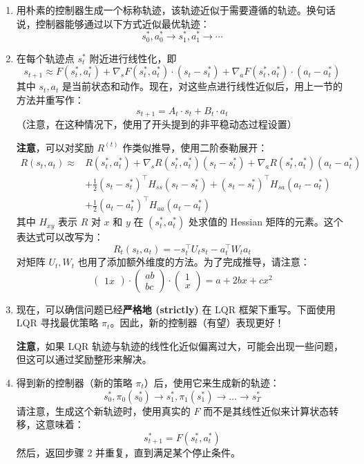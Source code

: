 \begin{enumerate}[label=\textbf{步骤 \arabic*}]
    \item 用朴素的控制器生成一个标称轨迹，该轨迹近似于需要遵循的轨迹。换句话说，控制器能够通过以下方式近似最优轨迹：
    \[
        s^*_0, a^*_0 \rightarrow s^*_1, a^*_1 \rightarrow \cdots
    \]

    \item 在每个轨迹点 $s^*_t$ 附近进行线性化，即
    \[
        s_{t+1} \approx F(s^*_t, a^*_t) + \nabla_s F(s^*_t, a^*_t) \cdot (s_t - s^*_t) + \nabla_a F(s^*_t, a^*_t) \cdot (a_t - a^*_t)
    \]
    其中 $s_t, a_t$ 是当前状态和动作。现在，对这些点进行线性近似后，用上一节的方法并重写作：
    \[
        s_{t+1} = A_t \cdot s_t + B_t \cdot a_t
    \]
    （注意，在这种情况下，使用了开头提到的非平稳动态过程设置）

    \textbf{注意}，可以对奖励 $R^{(t)}$ 作类似推导，使用二阶泰勒展开：
    \begin{align*}
        R(s_t, a_t) \approx 
        & R(s_t^*, a_t^*) + \nabla_s R(s_t^*, a_t^*)(s_t - s_t^*) + \nabla_a R(s_t^*, a_t^*)(a_t - a_t^*) \\
        & + \frac{1}{2}(s_t - s_t^*)^\top H_{ss}(s_t - s_t^*) + (s_t - s_t^*)^\top H_{sa}(a_t - a_t^*) \\
        & + \frac{1}{2}(a_t - a_t^*)^\top H_{aa}(a_t - a_t^*)
    \end{align*}
    其中 $H_{xy}$ 表示 $R$ 对 $x$ 和 $y$ 在 $(s_t^*, a_t^*)$ 处求值的 Hessian 矩阵的元素。这个表达式可以改写为：
    \[
        R_t(s_t, a_t) = -s_t^\top U_t s_t - a_t^\top W_t a_t
    \]
    对矩阵 $U_t, W_t$ 也用了添加额外维度的方法。为了完成推导，请注意：
    \[
        \begin{pmatrix} 1 x \end{pmatrix}
         \cdot 
        \begin{pmatrix} a b \\ b c \end{pmatrix} 
         \cdot 
        \begin{pmatrix} 1 \\ x \end{pmatrix}
        = a + 2bx + cx^2
    \]

    \item 现在，可以确信问题已经\textbf{严格地 (strictly)} 在 LQR 框架下重写。下面使用 LQR 寻找最优策略 $\pi_t$。因此，新的控制器（有望）表现更好！

    \textbf{注意}，如果 LQR 轨迹与轨迹的线性化近似偏离过大，可能会出现一些问题，但这可以通过奖励整形来解决。

    \item 得到新的控制器（新的策略 $\pi_t$）后，使用它来生成新的轨迹：
    \[
        s_0^*, \pi_0(s_0^*) \to s_1^*, \pi_1(s_1^*) \to \dots \to s_T^*
    \]
    请注意，生成这个新轨迹时，使用真实的 $F$ 而不是其线性近似来计算状态转移，这意味着：
    \[
        s_{t+1}^* = F(s_t^*, a_t^*)
    \]
    然后，返回步骤 2 并重复，直到满足某个停止条件。
\end{enumerate}

